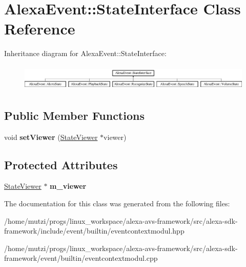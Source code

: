 \hypertarget{classAlexaEvent_1_1StateInterface}{}\section{Alexa\+Event\+:\+:State\+Interface Class Reference}
\label{classAlexaEvent_1_1StateInterface}
Inheritance diagram for Alexa\+Event\+:\+:State\+Interface\+:\begin{figure}[H]
\begin{center}
\leavevmode
\includegraphics[height=1.265537cm]{d8/de5/classAlexaEvent_1_1StateInterface}
\end{center}
\end{figure}
\subsection*{Public Member Functions}
\begin{DoxyCompactItemize}
\item 
\mbox{\label{classAlexaEvent_1_1StateInterface_a756fd341e976d61fa1a09a23f4ad4f5c}} 
void {\bfseries set\+Viewer} (\hyperlink{classAlexaEvent_1_1StateViewer}{State\+Viewer} $\ast$viewer)
\end{DoxyCompactItemize}
\subsection*{Protected Attributes}
\begin{DoxyCompactItemize}
\item 
\mbox{\label{classAlexaEvent_1_1StateInterface_ad0e7e6153ba63b889d3b19abfedf2806}} 
\hyperlink{classAlexaEvent_1_1StateViewer}{State\+Viewer} $\ast$ {\bfseries m\+\_\+viewer}
\end{DoxyCompactItemize}


The documentation for this class was generated from the following files\+:\begin{DoxyCompactItemize}
\item 
/home/mutzi/progs/linux\+\_\+workspace/alexa-\/avs-\/framework/src/alexa-\/sdk-\/framework/include/event/builtin/eventcontextmodul.\+hpp\item 
/home/mutzi/progs/linux\+\_\+workspace/alexa-\/avs-\/framework/src/alexa-\/sdk-\/framework/event/builtin/eventcontextmodul.\+cpp\end{DoxyCompactItemize}
